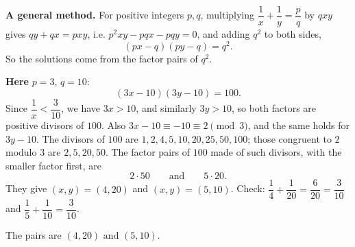 \textbf{A general method.} For positive integers $p,q$, multiplying $\dfrac1x+\dfrac1y=\dfrac pq$ by $qxy$ gives $qy+qx=pxy$, i.e. $p^2xy-pqx-pqy=0$, and adding $q^2$ to both sides,
\[(px-q)(py-q)=q^2.\]
So the solutions come from the factor pairs of $q^2$.

\textbf{Here} $p=3$, $q=10$:
\[(3x-10)(3y-10)=100.\]
Since $\dfrac1x<\dfrac3{10}$, we have $3x>10$, and similarly $3y>10$, so both factors are positive divisors of $100$. Also $3x-10\equiv-10\equiv2\pmod3$, and the same holds for $3y-10$. The divisors of $100$ are $1,2,4,5,10,20,25,50,100$; those congruent to $2$ modulo $3$ are $2,5,20,50$. The factor pairs of $100$ made of such divisors, with the smaller factor first, are
\[2\cdot50\qquad\text{and}\qquad5\cdot20.\]
They give $(x,y)=(4,20)$ and $(x,y)=(5,10)$. Check: $\dfrac14+\dfrac1{20}=\dfrac{6}{20}=\dfrac3{10}$ and $\dfrac15+\dfrac1{10}=\dfrac3{10}$.

The pairs are $\boxed{(4,20)\text{ and }(5,10)}$.
